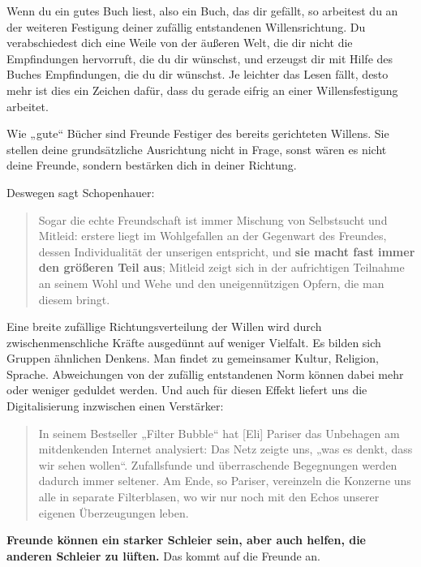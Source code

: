 \documentclass[12pt]{book}
\begin{document}
Wenn du ein gutes Buch liest, also ein Buch, das dir gefällt, so arbeitest du an der weiteren Festigung deiner zufällig entstandenen Willensrichtung. Du verabschiedest dich eine Weile von der äußeren Welt, die dir nicht die Empfindungen hervorruft, die du dir wünschst, und erzeugst dir mit Hilfe des Buches Empfindungen, die du dir  wünschst. Je leichter das Lesen fällt, desto mehr ist dies ein Zeichen dafür, dass du gerade eifrig an einer Willensfestigung arbeitet. 

Wie „gute“ Bücher sind Freunde Festiger des bereits gerichteten Willens. Sie stellen deine grundsätzliche Ausrichtung nicht in Frage, sonst wären es nicht deine Freunde, sondern bestärken dich in deiner Richtung. 

Deswegen sagt Schopenhauer:

\begin{quote}\begin{tcolorbox}
Sogar die echte Freundschaft ist immer Mischung von Selbstsucht und Mitleid: erstere liegt im Wohlgefallen an der Gegenwart des Freundes, dessen Individualität der unserigen entspricht, und \textbf{sie macht fast immer den größeren Teil aus}; Mitleid zeigt sich in der aufrichtigen Teilnahme an seinem Wohl und Wehe und den uneigennützigen Opfern, die man diesem bringt.
\end{tcolorbox}\end{quote}

Eine breite zufällige Richtungsverteilung der Willen wird durch zwischenmenschliche Kräfte ausgedünnt auf weniger Vielfalt. Es bilden sich Gruppen ähnlichen Denkens. Man findet zu gemeinsamer Kultur, Religion, Sprache. Abweichungen von der zufällig entstandenen Norm können dabei mehr oder weniger geduldet werden.
Und auch für diesen Effekt liefert uns die Digitalisierung inzwischen einen Verstärker:

\begin{quote}\begin{tcolorbox}
In seinem Bestseller „Filter Bubble“ hat [Eli] Pariser das Unbehagen am mitdenkenden Internet analysiert: Das Netz zeigte uns, „was es denkt, dass wir sehen wollen“. Zufallsfunde und überraschende Begegnungen werden dadurch immer seltener. Am Ende, so Pariser, vereinzeln die Konzerne uns alle in separate Filterblasen, wo wir nur noch mit den Echos unserer eigenen Überzeugungen leben.
\end{tcolorbox}\end{quote}

\textbf{Freunde können ein starker Schleier sein, aber auch helfen, die anderen Schleier zu lüften.} Das kommt auf die Freunde an.
\end{document}
